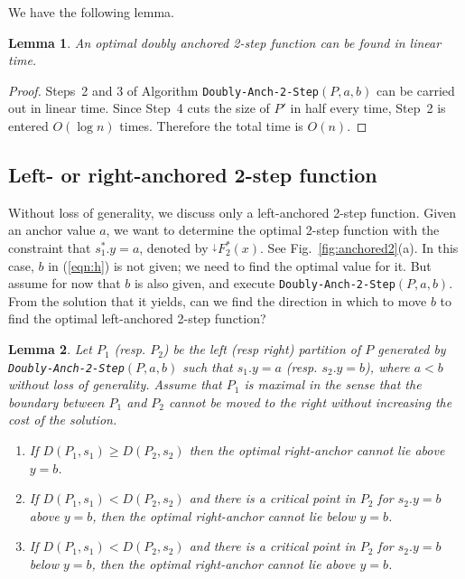 \documentclass[preprint,10pt]{elsarticle}
\newtheorem{lemma}{Lemma}
\begin{document}
We have the following lemma.
\begin{lemma}\label{lem:doublyAnchored}
An optimal doubly anchored 2-step function
can be found in linear time.
\end{lemma}
\begin{proof}
Steps~2 and 3 of Algorithm {\tt Doubly-Anch-2-Step}$(P,a,b)$ can be carried out in linear time.
Since Step~4 cuts the size of $P'$ in half every time, Step~2 is entered $O(\log n)$ times.
Therefore the total time is $O(n)$.
\end{proof}

\subsection{Left- or right-anchored 2-step function}
Without loss of generality, we discuss only a left-anchored 2-step function. 
Given an anchor value $a$,
we want to determine the optimal 2-step function with the constraint
that $s^*_1.y=a$, denoted by $^{\downarrow}\!F^*_2(x)$.
See Fig.~\ref{fig:anchored2}(a).
In this case, $b$ in (\ref{eqn:h}) is not given; 
we need to find the optimal value for it.
But assume for now that $b$ is also given,
and execute {\tt Doubly-Anch-2-Step}$(P,a,b)$.
From the solution that it yields,
can we find the direction in which to move $b$ to find the optimal
left-anchored 2-step function?
\begin{lemma}
Let $P_1$ (resp. $P_2$) be the left (resp right) partition of $P$ generated by {\tt Doubly-Anch-2-Step}$(P,a,b)$
such that  $s_1.y=a$ (resp. $s_2.y=b$), where $a<b$ without loss of generality.
Assume that $P_1$ is maximal in the sense that the boundary between $P_1$ and $P_2$
cannot be moved to the right without increasing the cost of the solution.
\begin{enumerate}
\item[(a)]
If $D(P_1, s_1) \geq D(P_2, s_2)$ then the optimal right-anchor cannot lie above $y=b$.
\item[(b)]
If $D(P_1, s_1) < D(P_2, s_2)$ and there is a critical point in $P_2$ for $s_2.y=b$ above $y=b$,
then the optimal right-anchor cannot lie below $y=b$.
\item[(c)]
If $D(P_1, s_1) < D(P_2, s_2)$ and there is a critical point in $P_2$ for $s_2.y=b$ below $y=b$,
then the optimal right-anchor cannot lie above $y=b$.
\end{enumerate}
\end{lemma}
\end{document}
